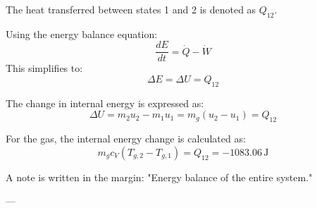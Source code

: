The heat transferred between states 1 and 2 is denoted as \( Q_{12} \).  

Using the energy balance equation:  
\[
\frac{dE}{dt} = \dot{Q} - \dot{W}
\]  
This simplifies to:  
\[
\Delta E = \Delta U = Q_{12}
\]  

The change in internal energy is expressed as:  
\[
\Delta U = m_2 u_2 - m_1 u_1 = m_g (u_2 - u_1) = Q_{12}
\]  

For the gas, the internal energy change is calculated as:  
\[
m_g c_V (T_{g,2} - T_{g,1}) = Q_{12} = -1083.06 \, \text{J}
\]  

A note is written in the margin: "Energy balance of the entire system."

---